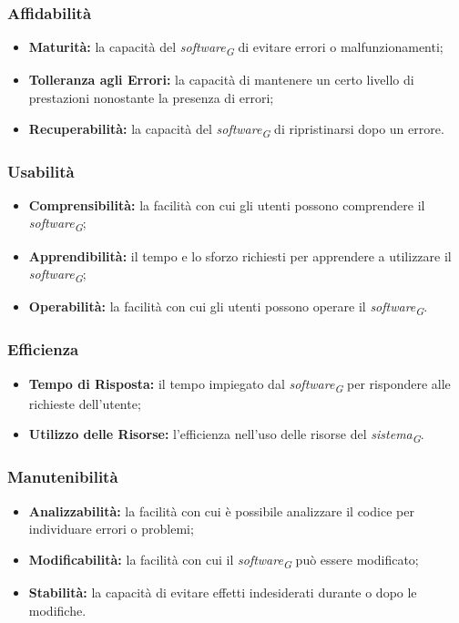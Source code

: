 \subsubsection{Affidabilità}
\begin{itemize}
    \item \textbf{Maturità:} la capacità del \textit{software}\textsubscript{\textit{G}} di evitare errori o malfunzionamenti;
    \item \textbf{Tolleranza agli Errori:} la capacità di mantenere un certo livello di prestazioni nonostante la presenza di errori;
    \item \textbf{Recuperabilità:} la capacità del \textit{software}\textsubscript{\textit{G}} di ripristinarsi dopo un errore.
\end{itemize}

\subsubsection{Usabilità}
\begin{itemize}
    \item \textbf{Comprensibilità:} la facilità con cui gli utenti possono comprendere il \textit{software}\textsubscript{\textit{G}};
    \item \textbf{Apprendibilità:} il tempo e lo sforzo richiesti per apprendere a utilizzare il \textit{software}\textsubscript{\textit{G}};
    \item \textbf{Operabilità:} la facilità con cui gli utenti possono operare il \textit{software}\textsubscript{\textit{G}}.
\end{itemize}

\subsubsection{Efficienza}
\begin{itemize}
    \item \textbf{Tempo di Risposta:} il tempo impiegato dal \textit{software}\textsubscript{\textit{G}} per rispondere alle richieste dell'utente;
    \item \textbf{Utilizzo delle Risorse:} l'efficienza nell'uso delle risorse del \textit{sistema}\textsubscript{\textit{G}}.
\end{itemize}

\subsubsection{Manutenibilità}
\begin{itemize}
    \item \textbf{Analizzabilità:} la facilità con cui è possibile analizzare il codice per individuare errori o problemi;
    \item \textbf{Modificabilità:} la facilità con cui il \textit{software}\textsubscript{\textit{G}} può essere modificato;
    \item \textbf{Stabilità:} la capacità di evitare effetti indesiderati durante o dopo le modifiche.
\end{itemize}

